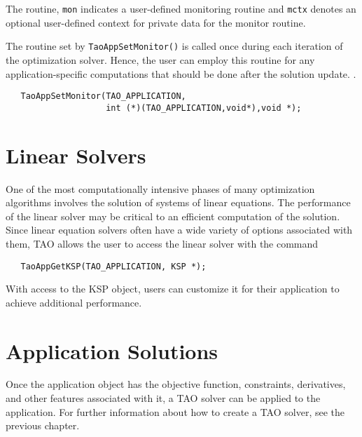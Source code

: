 The routine, {\tt mon} indicates a user-defined monitoring routine
and {\tt mctx} denotes an optional user-defined context for private 
data for the monitor routine.

The routine set by {\tt TaoAppSetMonitor()} is called once during each
iteration of the optimization solver.  Hence, the
user can employ this routine for any application-specific computations
that should be done after the solution update. 
.
\begin{verbatim}
   TaoAppSetMonitor(TAO_APPLICATION, 
                    int (*)(TAO_APPLICATION,void*),void *);
\end{verbatim}



\section{Linear Solvers}\label{sec:TaoLinearSolvers}
One of the most computationally intensive phases of many optimization
algorithms involves the solution of systems of linear equations.  
The performance
of the linear solver may be critical to an efficient computation
of the solution.
Since linear equation solvers often have a wide variety of options 
associated with them, TAO allows the user to access the linear
solver with the command

\begin{verbatim}
   TaoAppGetKSP(TAO_APPLICATION, KSP *);
\end{verbatim}

\noindent
With access to the KSP object, users can customize it for their application
to achieve additional performance.


\section{Application Solutions}
Once the application object has the 
objective function, constraints, derivatives, and other features associated with it,
a TAO solver can be applied to the application.  
For further information about how to create a TAO solver, see the previous chapter.

